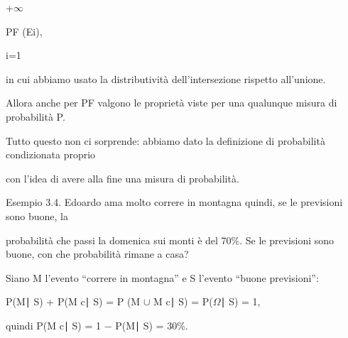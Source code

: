 \documentclass[a4paper,portrait,12pt]{article}
\begin{document}
+$\infty$





\begin{flushleft}
PF (Ei),
\end{flushleft}


\begin{flushleft}
i=1
\end{flushleft}





\begin{flushleft}
in cui abbiamo usato la distributivit\`{a} dell'intersezione rispetto all'unione.
\end{flushleft}


\begin{flushleft}
Allora anche per PF valgono le propriet\`{a} viste per una qualunque misura di probabilit\`{a} P.
\end{flushleft}


\begin{flushleft}
Tutto questo non ci sorprende: abbiamo dato la definizione di probabilit\`{a} condizionata proprio
\end{flushleft}


\begin{flushleft}
con l'idea di avere alla fine una misura di probabilit\`{a}.
\end{flushleft}


\begin{flushleft}
Esempio 3.4. Edoardo ama molto correre in montagna quindi, se le previsioni sono buone, la
\end{flushleft}


\begin{flushleft}
probabilit\`{a} che passi la domenica sui monti \`{e} del 70\%. Se le previsioni sono buone, con che probabilit\`{a} rimane a casa?
\end{flushleft}


\begin{flushleft}
Siano M l'evento ``correre in montagna'' e S l'evento ``buone previsioni'':
\end{flushleft}


\begin{flushleft}
P(M∣ S) + P(M c∣ S) = P (M $\cup$ M c∣ S) = P($\Omega$∣ S) = 1,
\end{flushleft}


\begin{flushleft}
quindi P(M c∣ S) = 1 $-$ P(M∣ S) = 30\%.
\end{flushleft}
\end{document}
